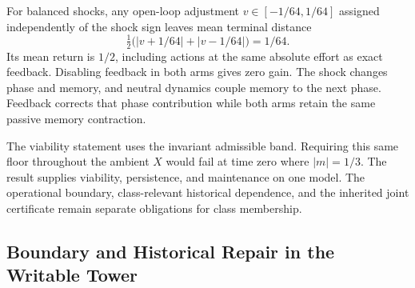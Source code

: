 \documentclass[11pt,a4paper]{article}
\theoremstyle{definition}
\begin{document}
For balanced shocks, any open-loop adjustment $v\in[-1/64,1/64]$ assigned independently of the shock sign leaves mean terminal distance
\[
 \tfrac12\bigl(|v+1/64|+|v-1/64|\bigr)=1/64 .
\]
Its mean return is $1/2$, including actions at the same absolute effort as exact feedback. Disabling feedback in both arms gives zero gain. The shock changes phase and memory, and neutral dynamics couple memory to the next phase. Feedback corrects that phase contribution while both arms retain the same passive memory contraction.

The viability statement uses the invariant admissible band. Requiring this same floor throughout the ambient $X$ would fail at time zero where $|m|=1/3$. The result supplies viability, persistence, and maintenance on one model. The operational boundary, class-relevant historical dependence, and the inherited joint certificate remain separate obligations for class membership.

\subsection{Boundary and Historical Repair in the Writable Tower}
\end{document}
